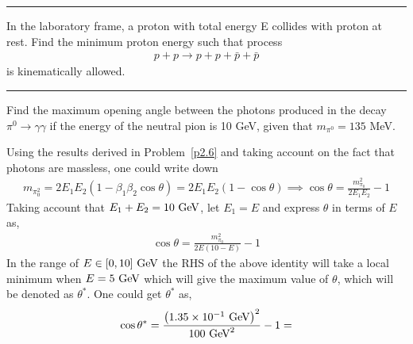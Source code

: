 \begin{solution}

\end{solution} 
\noindent\rule{7in}{1.5pt}



\begin{problem}{2.8}
    In the laboratory frame, a proton with total energy E collides with proton at rest. Find the minimum proton energy such that process
    \begin{align*}
        p+p \to p+p+\bar{p}+\bar{p}
    \end{align*}
    is kinematically allowed.
\end{problem}

\begin{solution}
        
\end{solution} 

\noindent\rule{7in}{1.5pt}


\begin{problem}{2.9}
Find the maximum opening angle between the photons produced in the decay $\pi^0\to\gamma\gamma$ if the energy of the neutral pion is 10 GeV, given that $m_{\pi^0}=135$ MeV.
\end{problem}

\begin{solution}
Using the results derived in Problem~\ref{p2.6} and taking account on the fact that photons are massless, one could write down 
\begin{align*}
    m_{\pi_0^2} = 2E_1E_2 \left( 1- \beta_1 \beta_2 \cos \theta \right) = 2E_1E_2 \left( 1- \cos\theta \right) \implies \cos \theta =  \frac{m_{\pi_0}^2}{2E_1E_2} - 1  
\end{align*}
Taking account that $E_1+E_2 = 10 \text{ GeV}$, let $E_1=E$ and express $\theta$ in terms of $E$ as,
\begin{align*}
    \cos \theta =  \frac{m_{\pi_0}^2}{2E(10-E)} - 1  
\end{align*}
In the range of $E\in[0,10]\text{ GeV}$ the RHS of the above identity will take a local minimum when $E=5\text{ GeV}$ which will give the maximum value of $\theta$, which will be denoted as $\theta^\ast$. One could get $\theta^\ast$ as,
\begin{align*}
    \cos \theta^\ast = \frac{\left( \num{1.35e-1}\text{ GeV} \right)^2}{100 \text{ GeV}^2} - 1 = 
\end{align*}
\end{solution} 

